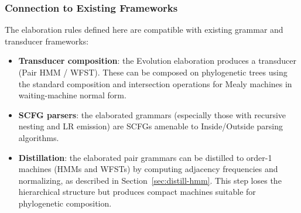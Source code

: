 \subsubsection{Connection to Existing Frameworks}

The elaboration rules defined here are compatible with existing
grammar and transducer frameworks:

\begin{itemize}
\item \textbf{Transducer composition}: the Evolution elaboration
  produces a transducer (Pair HMM / WFST).  These can be composed
  on phylogenetic trees using the standard composition and
  intersection operations for Mealy machines in waiting-machine
  normal form.

\item \textbf{SCFG parsers}: the elaborated grammars (especially
  those with recursive nesting and LR emission) are SCFGs
  amenable to Inside/Outside parsing algorithms.

\item \textbf{Distillation}: the elaborated pair grammars can be
  distilled to order-1 machines (HMMs and WFSTs) by computing
  adjacency frequencies and normalizing, as described in
  Section~\ref{sec:distill-hmm}.
  This step loses the hierarchical structure but
  produces compact machines suitable for phylogenetic composition.
\end{itemize}
